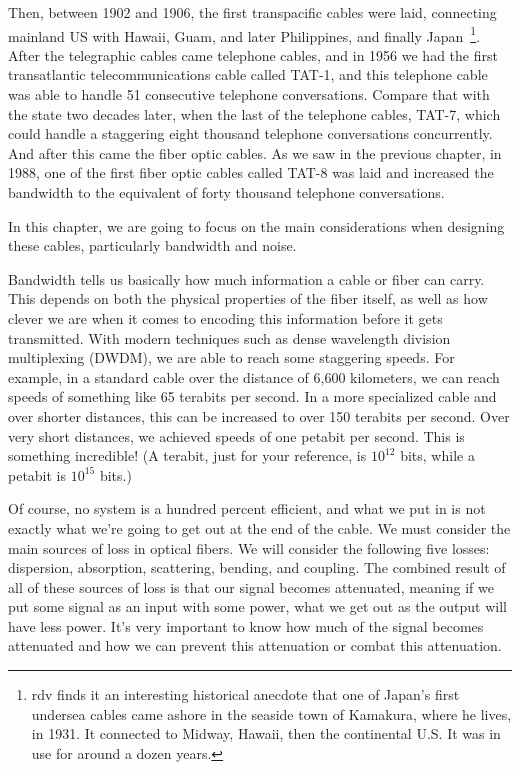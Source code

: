 Then, between 1902 and 1906, the first transpacific cables were laid, connecting mainland US with Hawaii, Guam, and later Philippines, and finally Japan~\footnote{rdv finds it an interesting historical anecdote that one of Japan's first undersea cables came ashore in the seaside town of Kamakura, where he lives, in 1931.  It connected to Midway, Hawaii, then the continental U.S.  It was in use for around a dozen years.}. After the telegraphic cables came telephone cables, and in 1956 we had the first transatlantic telecommunications cable called TAT-1, and this telephone cable was able to handle 51 consecutive telephone conversations. Compare that with the state two decades later, when the last of the  telephone cables, TAT-7, which could handle a staggering eight thousand telephone conversations concurrently. And after this came the fiber optic cables. As we saw in the previous chapter, in 1988, one of the first fiber optic cables called TAT-8 was laid and increased the bandwidth to the equivalent of forty thousand telephone conversations.


In this chapter, we are going to focus on the main considerations when designing these cables, particularly bandwidth and noise.

Bandwidth tells us basically how much information a cable or fiber can carry.
This depends on both the physical properties of the fiber itself, as well as how clever we are when it comes to encoding this information before it gets transmitted. With modern techniques such as dense wavelength division multiplexing (DWDM), we are able to reach some staggering speeds. For example, in a standard cable over the distance of 6,600 kilometers, we can reach speeds of something like 65 terabits per second. In a more specialized cable and over shorter distances, this can be increased to over 150 terabits per second. Over very short distances, we achieved speeds of one petabit per second. This is something incredible! (A terabit, just for your reference, is $10^{12}$ bits, while a petabit is $10^{15}$ bits.)

Of course, no system is a hundred percent efficient, and what we put in is not exactly what we're going to get out at the end of the cable. We must consider the main sources of loss in optical fibers. We will consider the following five losses: dispersion, absorption, scattering, bending, and coupling. The combined result of all of these sources of loss is that our signal becomes attenuated, meaning if we put some signal as an input with some power, what we get out as the output will have less power. It's very important to know how much of the signal becomes attenuated and how we can prevent this attenuation or combat this attenuation.

